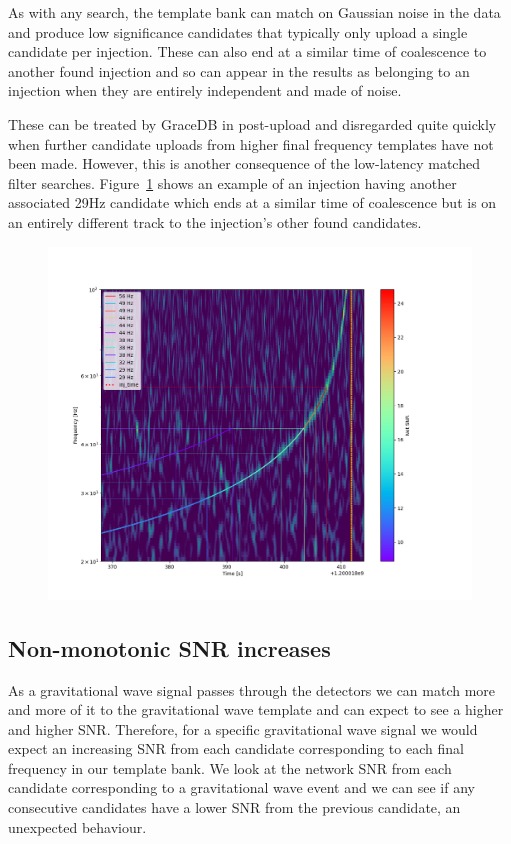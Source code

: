 As with any search, the template bank can match on Gaussian noise in the data and produce low significance candidates that typically only upload a single candidate per injection. These can also end at a similar time of coalescence to another found injection and so can appear in the results as belonging to an injection when they are entirely independent and made of noise.

These can be treated by GraceDB in post-upload and disregarded quite quickly when further candidate uploads from higher final frequency templates have not been made. However, this is another consequence of the low-latency matched filter searches. Figure~\ref{fig:ew_same_tc} shows an example of an injection having another associated 29Hz candidate which ends at a similar time of coalescence but is on an entirely different track to the injection's other found candidates.
%
\begin{figure}
       \centering
    \includegraphics[width=\textwidth]{images/ew/same_tc.png}
    \caption{}
    \label{fig:ew_same_tc}
\end{figure}
%
\subsection{Non-monotonic SNR increases}

As a gravitational wave signal passes through the detectors we can match more and more of it to the gravitational wave template and can expect to see a higher and higher SNR. Therefore, for a specific gravitational wave signal we would expect an increasing SNR from each candidate corresponding to each final frequency in our template bank. We look at the network SNR from each candidate corresponding to a gravitational wave event and we can see if any consecutive candidates have a lower SNR from the previous candidate, an unexpected behaviour.

